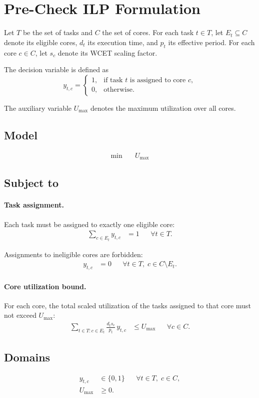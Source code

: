 \documentclass[11pt,a4paper]{article}
\begin{document}
\section{Pre-Check ILP Formulation}

Let \(T\) be the set of tasks and \(C\) the set of cores.
For each task \(t \in T\), let \(E_t \subseteq C\) denote its eligible cores,
\(d_t\) its execution time, and \(p_t\) its effective period.
For each core \(c \in C\), let \(s_c\) denote its WCET scaling factor.

The decision variable is defined as
\[
y_{t,c} =
\begin{cases}
1, & \text{if task } t \text{ is assigned to core } c,\\
0, & \text{otherwise.}
\end{cases}
\]

The auxiliary variable \(U_{\max}\) denotes the maximum utilization over all
cores.

\subsection*{Model}

\begin{align}
\min \quad & U_{\max}
\end{align}

\subsection*{Subject to}

\paragraph{Task assignment.}
Each task must be assigned to exactly one eligible core:
\begin{align}
\sum_{c \in E_t} y_{t,c} &= 1
&& \forall t \in T.
\end{align}

Assignments to ineligible cores are forbidden:
\begin{align}
y_{t,c} &= 0
&& \forall t \in T,\; c \in C \setminus E_t.
\end{align}

\paragraph{Core utilization bound.}
For each core, the total scaled utilization of the tasks assigned to that core
must not exceed \(U_{\max}\):
\begin{align}
\sum_{t \in T : c \in E_t}
\frac{d_t s_c}{p_t} \, y_{t,c}
&\leq U_{\max}
&& \forall c \in C.
\end{align}

\subsection*{Domains}

\begin{align}
y_{t,c} &\in \{0,1\}
&& \forall t \in T,\; c \in C,\\
U_{\max} &\geq 0.
\end{align}
\end{document}
